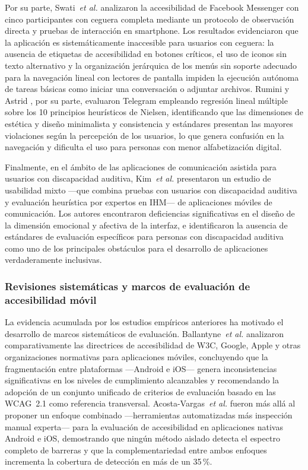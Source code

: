 \documentclass[journal]{IEEEtran}
\begin{document}
Por su parte, Swati~\textit{et al.} \cite{swati2021} analizaron la accesibilidad de Facebook Messenger con cinco participantes con ceguera completa mediante un protocolo de observaci\'on directa y pruebas de interacci\'on en smartphone. Los resultados evidenciaron que la aplicaci\'on es sistem\'aticamente inaccesible para usuarios con ceguera: la ausencia de etiquetas de accesibilidad en botones cr\'iticos, el uso de iconos sin texto alternativo y la organizaci\'on jer\'arquica de los men\'us sin soporte adecuado para la navegaci\'on lineal con lectores de pantalla impiden la ejecuci\'on aut\'onoma de tareas b\'asicas como iniciar una conversaci\'on o adjuntar archivos. Rumini y Astrid \cite{riumni2019}, por su parte, evaluaron Telegram empleando regresi\'on lineal m\'ultiple sobre los 10 principios heur\'isticos de Nielsen, identificando que las dimensiones de est\'etica y dise\~no minimalista y consistencia y est\'andares presentan las mayores violaciones seg\'un la percepci\'on de los usuarios, lo que genera confusi\'on en la navegaci\'on y dificulta el uso para personas con menor alfabetizaci\'on digital.

Finalmente, en el \'ambito de las aplicaciones de comunicaci\'on asistida para usuarios con discapacidad auditiva, Kim~\textit{et al.} \cite{kim2024} presentaron un estudio de usabilidad mixto ---que combina pruebas con usuarios con discapacidad auditiva y evaluaci\'on heur\'istica por expertos en IHM--- de aplicaciones m\'oviles de comunicaci\'on. Los autores encontraron deficiencias significativas en el dise\~no de la dimensi\'on emocional y afectiva de la interfaz, e identificaron la ausencia de est\'andares de evaluaci\'on espec\'ificos para personas con discapacidad auditiva como uno de los principales obst\'aculos para el desarrollo de aplicaciones verdaderamente inclusivas.

\subsubsection{Revisiones sistem\'aticas y marcos de evaluaci\'on de accesibilidad m\'ovil}

La evidencia acumulada por los estudios emp\'iricos anteriores ha motivado el desarrollo de marcos sistem\'aticos de evaluaci\'on. Ballantyne~\textit{et al.} \cite{ballantyne2018} analizaron comparativamente las directrices de accesibilidad de W3C, Google, Apple y otras organizaciones normativas para aplicaciones m\'oviles, concluyendo que la fragmentaci\'on entre plataformas ---Android e iOS--- genera inconsistencias significativas en los niveles de cumplimiento alcanzables y recomendando la adopci\'on de un conjunto unificado de criterios de evaluaci\'on basado en las WCAG~2.1 como referencia transversal. Acosta-Vargas~\textit{et al.} \cite{acosta2021} fueron m\'as all\'a al proponer un enfoque combinado ---herramientas automatizadas m\'as inspecci\'on manual experta--- para la evaluaci\'on de accesibilidad en aplicaciones nativas Android e iOS, demostrando que ning\'un m\'etodo aislado detecta el espectro completo de barreras y que la complementariedad entre ambos enfoques incrementa la cobertura de detecci\'on en m\'as de un 35\,\%.
\end{document}
